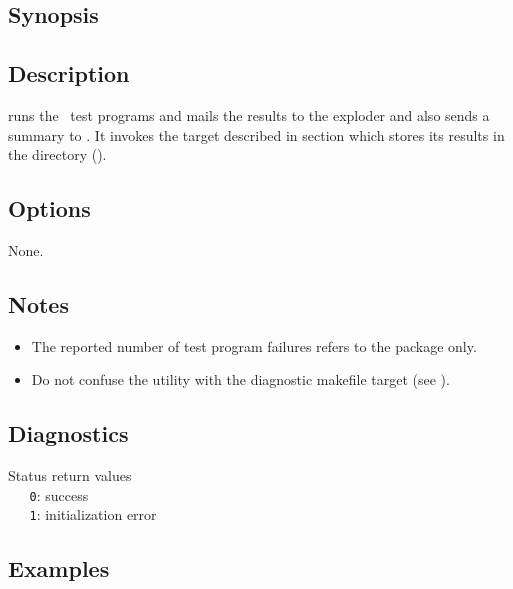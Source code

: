 \subsection*{Synopsis}
 
\begin{synopsis}
\end{synopsis}
 
\subsection*{Description}
 
 runs the \aipspp\ test programs and mails the results to the
 exploder and also sends a summary to .
It invokes the  target described in section  which stores its results in the 
directory ().
 
\subsection*{Options}
 
None.
 
\subsection*{Notes}
 
\begin{itemize}
\item
   The reported number of test program failures refers to the 
   package only.

\item
   Do not confuse the  utility with the 
   diagnostic makefile target (see ).
\end{itemize}
 
\subsection*{Diagnostics}
 
Status return values
\\ \verb+   0+: success
\\ \verb+   1+: initialization error\\
 
\subsection*{Examples}
 
